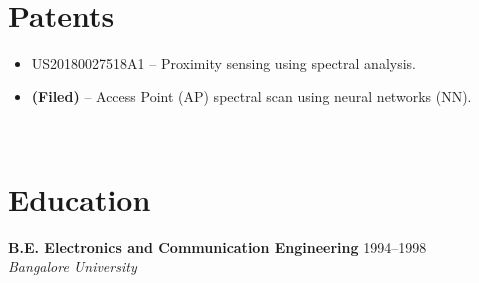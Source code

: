 \documentclass[a4paper,11pt]{article}
\begin{document}
\mbox{} \\

\section*{Patents}
\begin{itemize}
    \item \textsc{US20180027518A1} -- Proximity sensing using spectral analysis.
    \item \textbf{(Filed)} -- Access Point (AP) spectral scan using neural networks (NN).
\end{itemize}

\mbox{} \\

\section*{Education}
\textbf{B.E. Electronics and Communication Engineering} \hfill 1994--1998 \\
\textit{Bangalore University}

\pagestyle{fancy}
\fancyfoot[C]{\today} %
\end{document}

